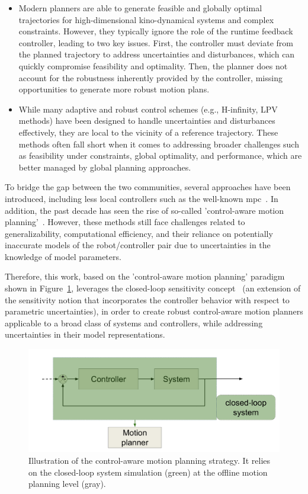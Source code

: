 \begin{itemize}
  \item Modern planners are able to generate feasible and globally optimal trajectories for high-dimensional kino-dynamical systems and complex constraints. 
  However, they typically ignore the role of the runtime feedback controller, leading to two key issues.
  First, the controller must deviate from the planned trajectory to address uncertainties and disturbances, which can quickly compromise feasibility and optimality.
  Then, the planner does not account for the robustness inherently provided by the controller, missing opportunities to generate more robust motion plans.
  \item While many adaptive and robust control schemes (e.g., H-infinity, LPV methods) have been designed to handle uncertainties and disturbances effectively, they are local to the vicinity of a reference trajectory. 
  These methods often fall short when it comes to addressing broader challenges such as feasibility under constraints, global optimality, and performance, which are better managed by global planning approaches.
\end{itemize}
    
To bridge the gap between the two communities, several approaches have been introduced, including less local controllers such as the well-known \gls{mpc}~\cite{cTMPC}. 
In addition, the past decade has seen the rise of so-called 'control-aware motion planning'~\cite{cTognon, cContractThMP, cMajundarLibrary}. 
However, these methods still face challenges related to generalizability, computational efficiency, and their reliance on potentially inaccurate models of the robot/controller pair due to uncertainties in the knowledge of model parameters.

Therefore, this work, based on the 'control-aware motion planning' paradigm shown in Figure~\ref{fig:ca_strat}, leverages the closed-loop sensitivity concept~\cite{cPi,cTh} (an extension of the sensitivity notion that incorporates the controller behavior with respect to parametric uncertainties), in order to create robust control-aware motion planners applicable to a broad class of systems and controllers, while addressing uncertainties in their model representations.

\begin{figure} [htp]
    \centering
    \includegraphics[width=0.8\linewidth]{figures/intro/control-aware.png} 
    \caption{Illustration of the control-aware motion planning strategy.
    It relies on the closed-loop system simulation (green) at the offline motion planning level (gray).}%
    \label{fig:ca_strat}%
  \end{figure}

